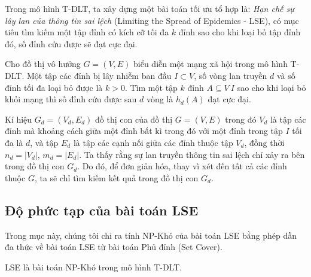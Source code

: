 Trong mô hình T-DLT, ta xây dựng một bài toán tối ưu tổ hợp là: {\itshape Hạn chế sự lây lan của thông tin sai lệch} (Limiting the Spread of Epidemics - LSE), có mục tiêu tìm kiếm một tập đỉnh có kích cỡ tối đa $k$ đỉnh sao cho khi loại bỏ tập đỉnh đó, số đỉnh cứu được sẽ đạt cực đại.  

\begin{define}
	Cho đồ thị vô hướng $G=(V,E)$ biểu diễn một mạng xã hội trong mô hình T-DLT. Một tập các đỉnh bị lây nhiễm ban đầu $I \subset V$, số vòng lan truyền $d$ và số đỉnh tối đa loại bỏ được là $k > 0$. Tìm một tập $k$ đỉnh  $A \subseteq V \ I$ sao cho khi loại bỏ khỏi mạng thì số đỉnh cứu được sau $d$ vòng là $h_{d}(A)$ đạt cực đại.
\end{define}

Kí hiệu $G_{d} = (V_{d}, E_{d})$ đồ thị con của đồ thị $G=(V, E)$ trong đó $V_{d}$ là tập các đỉnh mà khoảng cách giữa một đỉnh bất kì trong đó với một đỉnh trong tập $I$ tối đa là $d$, và tập $E_{d}$ là tập các cạnh nối giữa các đỉnh thuộc tập $V_{d}$, đồng thời $n_{d} = | V_{d} |$, $m_{d} = | E_{d} |$. Ta thấy rằng sự lan truyền thông tin sai lệch chỉ xảy ra bên trong đồ thị con $G_{d}$. Do đó, để đơn giản hóa, thay vì xét đến tất cả các đỉnh thuộc $G$, ta sẽ chỉ tìm kiếm kết quả trong đồ thị con $G_{d}$.

\subsection{Độ phức tạp của bài toán LSE}
Trong mục này, chúng tôi chỉ ra tính NP-Khó của bài toán LSE bằng phép dẫn đa thức về bài toán LSE từ bài toán Phủ đỉnh (Set Cover). 

\begin{theo}
	LSE là bài toán NP-Khó trong mô hình T-DLT.
\end{theo}

